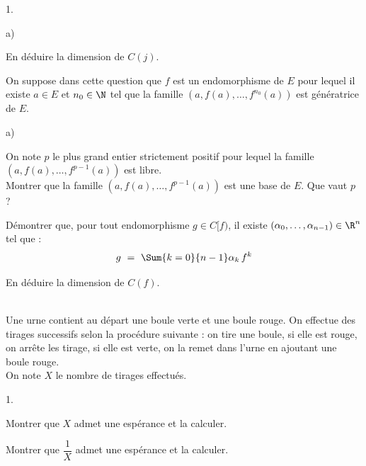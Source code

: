 \documentclass[11pt]{article}%
\begin{document}
\begin{exerciceAP}
\begin{noliste}{1.}
\begin{noliste}{a)}
      \item En déduire la dimension de $C(j)$.
    \end{noliste}
    
  \item On suppose dans cette question que $f$ est un endomorphisme
    de $E$ pour lequel il existe $a \in E$ et $n_0 \in \N$ tel que
    la famille $(a, f(a), \ldots, f^{n_0}(a))$  est génératrice de $E$.
    \begin{noliste}{a)}
    \item On note $p$ le plus grand entier strictement positif pour
      lequel la famille $(a, f(a), \ldots, f^{p-1}(a))$ est libre.\\
      Montrer que la famille $(a, f(a), \ldots, f^{p-1}(a))$ est une
      base de $E$. Que vaut $p$ ?
      
    \item Démontrer que, pour tout endomorphisme $g \in C[f)$, il existe 
      $(\alpha_0, \ldots, \alpha_{n-1}) \in \R^{n}$ tel que : 
      \[
        g \ = \ \Sum{k=0}{n-1} \alpha_k \, f^k
      \]
      
    \item En déduire la dimension de $C(f)$.
    \end{noliste}
  \end{noliste}
\end{exerciceAP}



\begin{exerciceSP}~\\
  Une urne contient au départ une boule verte et une boule rouge.
  On effectue des tirages successifs selon la procédure suivante : 
  on tire une boule, si elle est rouge, on arrête les tirage, si elle
  est verte, on la remet dans l'urne en ajoutant une boule rouge.\\
  On note $X$ le nombre de tirages effectués.
  \begin{noliste}{1.}
  \item Montrer que $X$ admet une espérance et la calculer.
    
  \item Montrer que $\dfrac{1}{X}$ admet une espérance et la calculer.
  \end{noliste}
  
\end{exerciceSP}




\newpage
\end{document}
